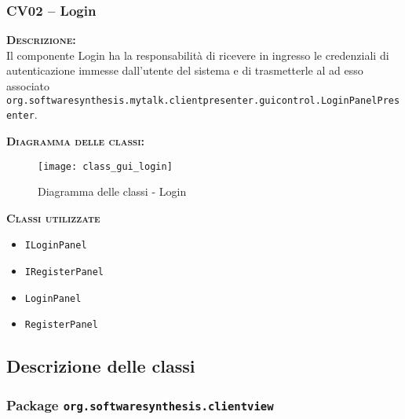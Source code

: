 \subsubsection{CV02 -- Login}\label{sec:cv02}
\begin{description}
  \item{\scshape\bfseries Descrizione:}\\
Il componente \textsf{Login} ha la responsabilità di ricevere in ingresso le credenziali di autenticazione immesse dall'utente del sistema e di trasmetterle al  ad esso associato \texttt{org.softwaresynthesis.mytalk.clientpresenter.guicontrol.LoginPanelPresenter}.

	\item{\scshape\bfseries Diagramma delle classi:}
  \begin{figure}[H]
    \centering
    \texttt{[image: class\_gui\_login]}
    \caption{Diagramma delle classi - Login}\label{fig:login}
  \end{figure}

  \item{\scshape\bfseries Classi utilizzate}
  \begin{itemize}[noitemsep,nolistsep]
  	\item \texttt{ILoginPanel}
    \item \texttt{IRegisterPanel}
    \item \texttt{LoginPanel}
    \item \texttt{RegisterPanel}
  \end{itemize}

\end{description}

\subsection{Descrizione delle classi}

\subsubsection{Package \texttt{org.softwaresynthesis.clientview}}

